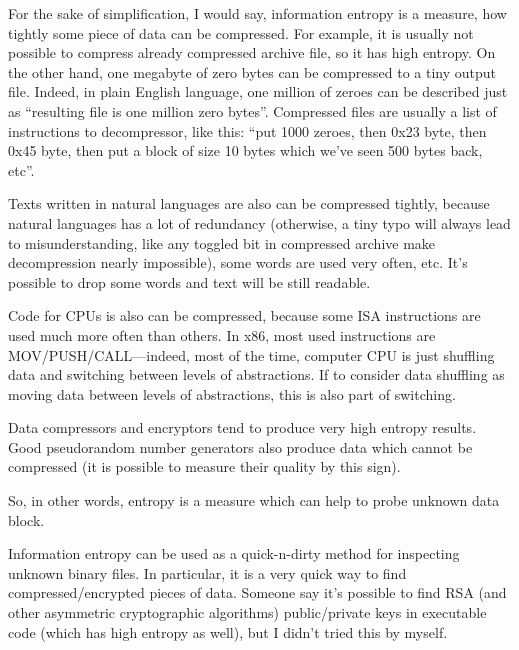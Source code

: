 \label{entropy}

For the sake of simplification, I would say, information entropy is a measure, how tightly some piece of data can be compressed.
For example, it is usually not possible to compress already compressed archive file, so it has high entropy.
On the other hand, one megabyte of zero bytes can be compressed to a tiny output file.
Indeed, in plain English language, one million of zeroes can be described just as ``resulting file is one million zero bytes''.
Compressed files are usually a list of instructions to decompressor, like this: ``put 1000 zeroes, then 0x23 byte, then 0x45 byte, then put a block of size 10 bytes which we've seen 500 bytes back, etc''.

Texts written in natural languages are also can be compressed tightly, 
because natural languages has a lot of redundancy
(otherwise, a tiny typo will always lead to misunderstanding, 
like any toggled bit in compressed archive make decompression nearly impossible), 
some words are used very often, etc.
It's possible to drop some words and text will be still readable.

Code for CPUs is also can be compressed, because some ISA instructions are used much more often than others.
In x86, most used instructions are MOV/PUSH/CALL---indeed, most of the time, computer CPU is just shuffling data and switching between
levels of abstractions.
If to consider data shuffling as moving data between levels of abstractions, this is also part of switching.

Data compressors and encryptors tend to produce very high entropy results.
Good pseudorandom number generators also produce data which cannot be compressed 
(it is possible to measure their quality by this sign).

So, in other words, entropy is a measure which can help to probe unknown data block.




Information entropy can be used as a quick-n-dirty method for inspecting unknown binary files.
In particular, it is a very quick way to find compressed/encrypted pieces of data.
Someone say it's possible to find RSA (and other asymmetric cryptographic algorithms) public/private keys 
in executable code (which has high entropy as well), but I didn't tried this by myself.

